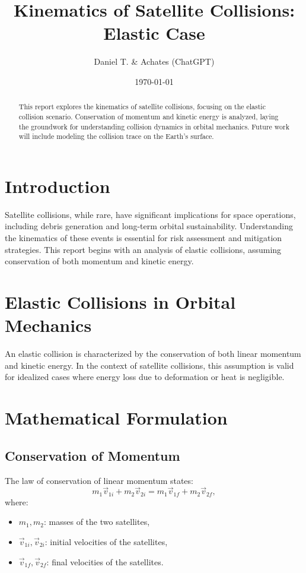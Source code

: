 \documentclass[12pt]{article}
\title{Kinematics of Satellite Collisions: Elastic Case}
\author{Daniel T. \& Achates (ChatGPT)}
\date{\today}
\begin{document}
\maketitle

\begin{abstract}
This report explores the kinematics of satellite collisions, focusing on the elastic collision scenario. Conservation of momentum and kinetic energy is analyzed, laying the groundwork for understanding collision dynamics in orbital mechanics. Future work will include modeling the collision trace on the Earth's surface.
\end{abstract}

\section{Introduction}
Satellite collisions, while rare, have significant implications for space operations, including debris generation and long-term orbital sustainability. Understanding the kinematics of these events is essential for risk assessment and mitigation strategies. This report begins with an analysis of elastic collisions, assuming conservation of both momentum and kinetic energy.

\section{Elastic Collisions in Orbital Mechanics}
An elastic collision is characterized by the conservation of both linear momentum and kinetic energy. In the context of satellite collisions, this assumption is valid for idealized cases where energy loss due to deformation or heat is negligible.

\section{Mathematical Formulation}

\subsection{Conservation of Momentum}
The law of conservation of linear momentum states:
\begin{equation}
    m_1 \vec{v}_{1i} + m_2 \vec{v}_{2i} = m_1 \vec{v}_{1f} + m_2 \vec{v}_{2f},
\end{equation}
where:
\begin{itemize}
    \item $m_1, m_2$: masses of the two satellites,
    \item $\vec{v}_{1i}, \vec{v}_{2i}$: initial velocities of the satellites,
    \item $\vec{v}_{1f}, \vec{v}_{2f}$: final velocities of the satellites.
\end{itemize}
\end{document}
